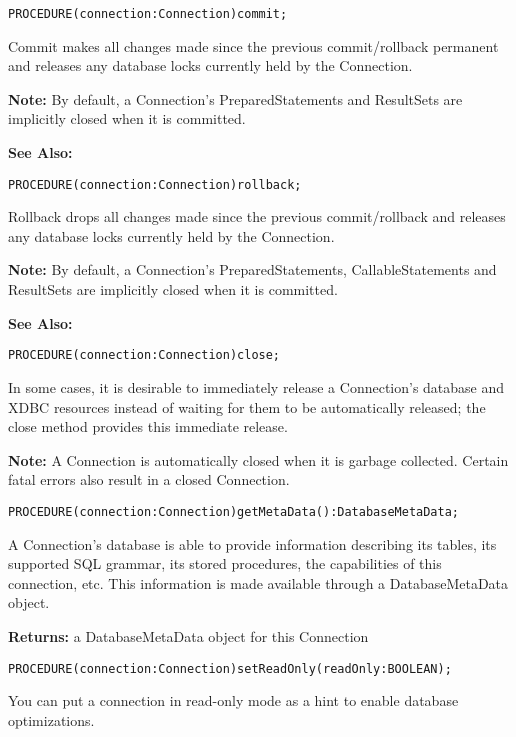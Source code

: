 \verb'PROCEDURE(connection:Connection)commit;'

     Commit makes all changes made since the previous commit/rollback permanent and releases any database locks currently
     held by the Connection. 

     {\bf Note:} By default, a Connection's PreparedStatements and ResultSets are implicitly closed when it is
     committed. 

     {\bf See Also:} 


\verb'PROCEDURE(connection:Connection)rollback;'

     Rollback drops all changes made since the previous commit/rollback and releases any database locks currently held by the
     Connection. 

     {\bf Note:} By default, a Connection's PreparedStatements, CallableStatements and ResultSets are implicitly closed when it is
     committed. 

     {\bf See Also:} 


\verb'PROCEDURE(connection:Connection)close;'

     In some cases, it is desirable to immediately release a Connection's database and XDBC resources instead of waiting for
     them to be automatically released; the close method provides this immediate release. 

     {\bf Note:} A Connection is automatically closed when it is garbage collected. Certain fatal errors also result in a closed Connection. 


\verb'PROCEDURE(connection:Connection)getMetaData():DatabaseMetaData;'

     A Connection's database is able to provide information describing its tables, its supported SQL grammar, its stored
     procedures, the capabilities of this connection, etc. This information is made available through a DatabaseMetaData object. 

     {\bf Returns:} 
          a DatabaseMetaData object for this Connection 


\verb'PROCEDURE(connection:Connection)setReadOnly(readOnly:BOOLEAN);'

     You can put a connection in read-only mode as a hint to enable database optimizations. 

